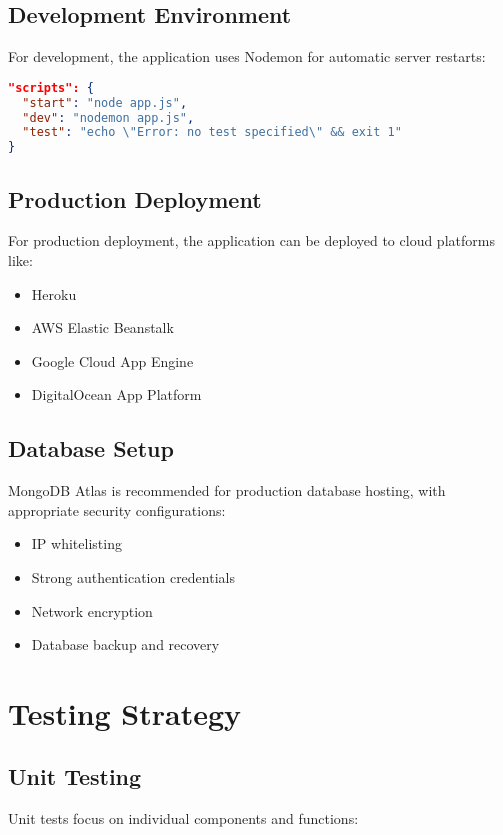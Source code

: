 \documentclass[12pt,a4paper]{report}
\begin{document}
\section{Development Environment}
For development, the application uses Nodemon for automatic server restarts:

\begin{lstlisting}[language=JSON]
"scripts": {
  "start": "node app.js",
  "dev": "nodemon app.js",
  "test": "echo \"Error: no test specified\" && exit 1"
}
\end{lstlisting}

\section{Production Deployment}
For production deployment, the application can be deployed to cloud platforms like:

\begin{itemize}
    \item Heroku
    \item AWS Elastic Beanstalk
    \item Google Cloud App Engine
    \item DigitalOcean App Platform
\end{itemize}

\section{Database Setup}
MongoDB Atlas is recommended for production database hosting, with appropriate security configurations:

\begin{itemize}
    \item IP whitelisting
    \item Strong authentication credentials
    \item Network encryption
    \item Database backup and recovery
\end{itemize}

\chapter{Testing Strategy}

\section{Unit Testing}
Unit tests focus on individual components and functions:
\end{document}
